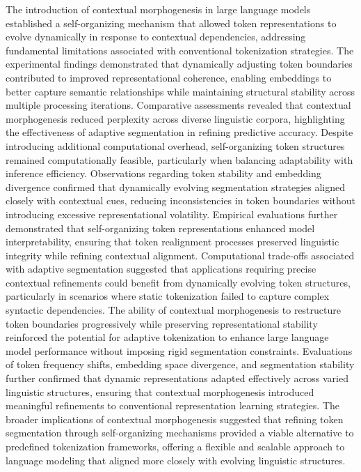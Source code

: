 \documentclass{article}
\begin{document}
The introduction of contextual morphogenesis in large language models established a self-organizing mechanism that allowed token representations to evolve dynamically in response to contextual dependencies, addressing fundamental limitations associated with conventional tokenization strategies. The experimental findings demonstrated that dynamically adjusting token boundaries contributed to improved representational coherence, enabling embeddings to better capture semantic relationships while maintaining structural stability across multiple processing iterations. Comparative assessments revealed that contextual morphogenesis reduced perplexity across diverse linguistic corpora, highlighting the effectiveness of adaptive segmentation in refining predictive accuracy. Despite introducing additional computational overhead, self-organizing token structures remained computationally feasible, particularly when balancing adaptability with inference efficiency. Observations regarding token stability and embedding divergence confirmed that dynamically evolving segmentation strategies aligned closely with contextual cues, reducing inconsistencies in token boundaries without introducing excessive representational volatility. Empirical evaluations further demonstrated that self-organizing token representations enhanced model interpretability, ensuring that token realignment processes preserved linguistic integrity while refining contextual alignment. Computational trade-offs associated with adaptive segmentation suggested that applications requiring precise contextual refinements could benefit from dynamically evolving token structures, particularly in scenarios where static tokenization failed to capture complex syntactic dependencies. The ability of contextual morphogenesis to restructure token boundaries progressively while preserving representational stability reinforced the potential for adaptive tokenization to enhance large language model performance without imposing rigid segmentation constraints. Evaluations of token frequency shifts, embedding space divergence, and segmentation stability further confirmed that dynamic representations adapted effectively across varied linguistic structures, ensuring that contextual morphogenesis introduced meaningful refinements to conventional representation learning strategies. The broader implications of contextual morphogenesis suggested that refining token segmentation through self-organizing mechanisms provided a viable alternative to predefined tokenization frameworks, offering a flexible and scalable approach to language modeling that aligned more closely with evolving linguistic structures.





\end{document}
